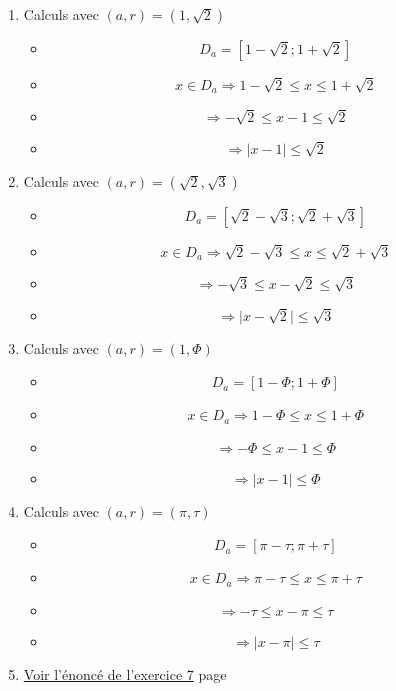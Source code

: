 \documentclass[a4paper,11pt]{book}
\begin{document}
\begin{enumerate}
\item Calculs avec \((a, r) = (1, \sqrt{2})\)
\begin{itemize}
\item \[D_a = [1-\sqrt{2} ; 1+\sqrt{2}]\]
\item \[x\in D_a \Rightarrow 1-\sqrt{2}\leq x\leq 1+\sqrt{2}\]
\item \[\Rightarrow -\sqrt{2}\leq x - 1\leq \sqrt{2}\]
\item \[\Rightarrow \lvert x - 1\rvert \leq \sqrt{2}\]
\end{itemize}
\item Calculs avec \((a, r) = (\sqrt{2}, \sqrt{3})\)
\begin{itemize}
\item \[D_a = [\sqrt{2}-\sqrt{3} ; \sqrt{2}+\sqrt{3}]\]
\item \[x\in D_a \Rightarrow \sqrt{2}-\sqrt{3}\leq x\leq \sqrt{2}+\sqrt{3}\]
\item \[\Rightarrow -\sqrt{3}\leq x - \sqrt{2}\leq \sqrt{3}\]
\item \[\Rightarrow \lvert x - \sqrt{2}\rvert \leq \sqrt{3}\]
\end{itemize}
\item Calculs avec \((a, r) = (1, \Phi)\)
\begin{itemize}
\item \[D_a = [1-\Phi ; 1+\Phi]\]
\item \[x\in D_a \Rightarrow 1-\Phi\leq x\leq 1+\Phi\]
\item \[\Rightarrow -\Phi\leq x - 1\leq \Phi\]
\item \[\Rightarrow \lvert x - 1\rvert \leq \Phi\]
\end{itemize}
\item Calculs avec \((a, r) = (\pi, \tau)\)
\begin{itemize}
\item \[D_a = [\pi-\tau ; \pi+\tau]\]
\item \[x\in D_a \Rightarrow \pi-\tau\leq x\leq \pi+\tau\]
\item \[\Rightarrow -\tau\leq x - \pi\leq \tau\]
\item \[\Rightarrow \lvert x - \pi\rvert \leq \tau\]
\end{itemize}

\item \hyperref[org69ab718]{Voir l'énoncé de l'exercice 7}
page~\pageref{page:sec2.4.2exo7}
\end{enumerate}
\end{document}
